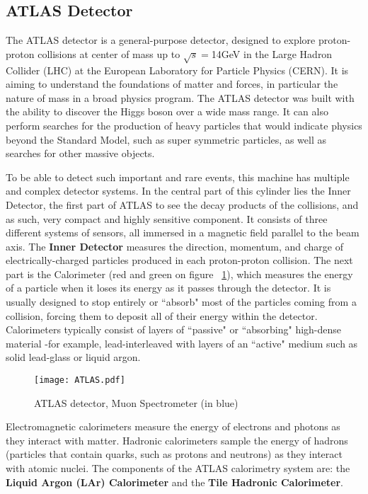 \subsection{ATLAS Detector}
The ATLAS detector is a general-purpose detector, designed to explore proton-proton collisions at center of mass up
to $\sqrt{s}=$14GeV in the Large Hadron Collider (LHC) at the European Laboratory for Particle Physics (CERN). It is
aiming to understand the foundations of matter and forces, in particular the nature of mass in a broad physics
program. The ATLAS detector was built with the ability to discover the Higgs boson over a wide mass range. It can also
perform searches for the production of heavy particles that would indicate physics beyond the Standard Model, such as
super symmetric particles, as well as searches for other massive objects. \par 
To be able to detect such important and rare events, this machine has multiple and complex detector systems. In the
central part of this cylinder lies the Inner Detector, the first part of ATLAS to see the decay products of the
collisions, and as such, very compact and highly sensitive component. It consists of three different systems of sensors, all immersed
in a magnetic field parallel to the beam axis. The {\bf Inner Detector} measures the direction, momentum, and charge of
electrically-charged particles produced in each proton-proton collision. The next part is the Calorimeter (red and green
on figure ~\ref{fig:ATLAS}), which  measures the energy of a particle when it loses its energy as it passes through the
detector. It is usually designed to stop entirely or ``absorb" most of the particles coming from a collision, forcing them
to deposit all of their energy within the detector. Calorimeters typically consist of layers of ``passive" or
``absorbing" high-dense material -for example, lead-interleaved with layers of an ``active" medium such as solid
lead-glass or liquid argon.\par
\begin{figure}[ht]
		\centering
		\texttt{[image: ATLAS.pdf]}
		\caption{ATLAS detector, Muon Spectrometer (in blue)}\label{fig:ATLAS}
\end{figure}
Electromagnetic calorimeters measure the energy of electrons and photons as they interact with matter. Hadronic
calorimeters sample the energy of hadrons (particles that contain quarks, such as protons and neutrons) as they interact
with atomic nuclei. The components of the ATLAS calorimetry system are: the {\bf Liquid Argon (LAr) Calorimeter} and the
{\bf Tile Hadronic Calorimeter}.\par

